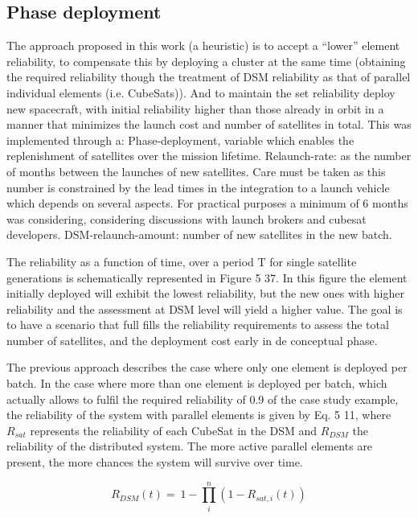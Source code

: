 
\subsection{Phase deployment}

The approach proposed in this work (a heuristic) is to accept a “lower” element reliability, to compensate this by deploying a cluster at the same time (obtaining the required reliability though the treatment of DSM reliability as that of parallel individual elements (i.e. CubeSats)). And to maintain the set reliability deploy new spacecraft, with initial reliability higher than those already in orbit in a manner that minimizes the launch cost and number of satellites in total. This was implemented through a:
Phase-deployment, variable which enables the replenishment of satellites over the mission lifetime.
Relaunch-rate: as the number of months between the launches of new satellites. Care must be taken as this number is constrained by the lead times in the integration to a launch vehicle which depends on several aspects. For practical purposes a minimum of 6 months was considering, considering discussions with launch brokers and cubesat developers.
DSM-relaunch-amount: number of new satellites in the new batch.

The reliability as a function of time, over a period T for single satellite generations is schematically represented in 
Figure 5 37. In this figure the element initially deployed will exhibit the lowest reliability, but the new ones with higher reliability and the assessment at DSM level will yield a higher value. The goal is to have a scenario that full fills the reliability requirements to assess the total number of satellites, and the deployment cost early in de conceptual phase.


The previous approach describes the case where only one element is deployed per batch. In the case where more than one element is deployed per batch, which actually allows to fulfil the required reliability of 0.9 of the case study example, the reliability of the system with parallel elements is given by Eq. 5 11, where \(R_{sat}\) represents the reliability of each CubeSat in the DSM and \(R_{DSM}\) the reliability of the distributed system. The more active parallel elements are present, the more chances the system will survive over time.

\[R_{DSM}\left(t\right)=\ 1-\prod_{i}^{n}{(1-R_{sat,i}(t))}\]

